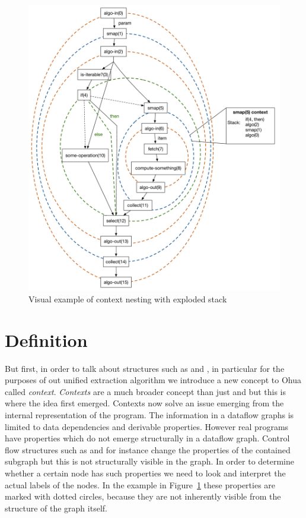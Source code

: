 \begin{figure}
    \includegraphics[width=\linewidth]{../Figures/context-nesting-example-exploded}
    \caption{Visual example of context nesting with exploded stack}
    \label{fig:visual-context-nesting-example-exploded}
\end{figure}

\section{Definition}

But first, in order to talk about structures such as \smap{} and \ifop{}, in particular for the purposes of out unified extraction algorithm we introduce a new concept to Ohua called \emph{context}.
\emph{Contexts} are a much broader concept than just \ifop{} and \smap{} but this is where the idea first emerged.
Contexts now solve an issue emerging from the internal representation of the program.
The information in a dataflow graphs is limited to data dependencies and derivable properties.
However real programs have properties which do not emerge structurally in a dataflow graph.
Control flow structures such as \smap{} and \ifop{} for instance change the properties of the contained subgraph but this is not structurally visible in the graph.
In order to determine whether a certain node has such properties we need to look and interpret the actual labels of the nodes.
In the example in Figure~\ref{fig:visual-context-nesting-example-exploded} these properties are marked with dotted circles, because they are not inherently visible from the structure of the graph itself.

